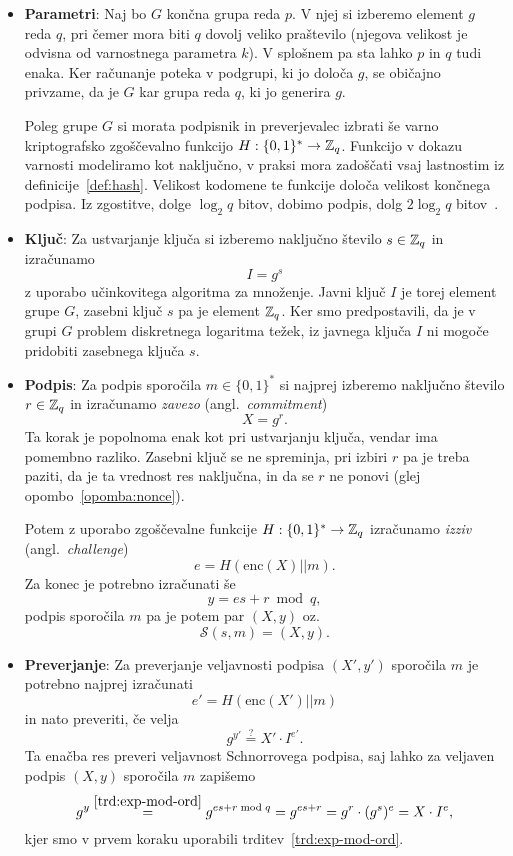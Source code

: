 \begin{itemize}
    \item \textbf{Parametri}:
    Naj bo $G$ končna grupa reda $p$. V njej si izberemo element $g$ reda $q$, pri čemer mora
    biti $q$ dovolj veliko praštevilo (njegova velikost je odvisna od varnostnega parametra $k$).
    V splošnem pa sta lahko $p$ in $q$ tudi enaka. Ker računanje poteka v podgrupi, ki jo določa $g$,
    se običajno privzame, da je $G$ kar grupa reda $q$, ki jo generira $g$.

    Poleg grupe $G$ si morata podpisnik in preverjevalec izbrati še varno kriptografsko zgoščevalno
    funkcijo $H : \{0, 1\}^* \rightarrow \mathbb Z_q$. Funkcijo v dokazu varnosti modeliramo kot naključno,
    v praksi mora zadoščati vsaj lastnostim iz definicije~\ref{def:hash}. Velikost kodomene te funkcije
    določa velikost končnega podpisa. Iz zgostitve, dolge $\log_2 q$ bitov, dobimo podpis, dolg
    $2 \log_2 q$ bitov~\cite{stinson2023crypto}.
    \item \textbf{Ključ}:
    Za ustvarjanje ključa si izberemo naključno število $s \in \mathbb Z_q$ in izračunamo
    $$
    I = g^s
    $$
    z uporabo učinkovitega algoritma za množenje. Javni ključ $I$ je torej element grupe $G$, zasebni ključ
    $s$ pa je element $\mathbb Z_q$. Ker smo predpostavili, da je v grupi $G$ problem diskretnega logaritma
    težek, iz javnega ključa $I$ ni mogoče pridobiti zasebnega ključa $s$.

    \item \textbf{Podpis}:
    Za podpis sporočila $m \in \{0, 1\}^*$ si najprej izberemo naključno število $r \in \mathbb Z_q$ in izračunamo
    \textit{zavezo} (angl.\ \textit{commitment})
    $$
    X = g^r.
    $$
    Ta korak je popolnoma enak kot pri ustvarjanju ključa, vendar ima pomembno razliko. Zasebni
    ključ se ne spreminja, pri izbiri $r$ pa je treba paziti, da je ta vrednost res naključna, in da se
    $r$ ne ponovi (glej opombo~\ref{opomba:nonce}).

    Potem z uporabo zgoščevalne funkcije $H : \{0, 1\}^* \rightarrow \mathbb Z_q$ izračunamo \textit{izziv}
    (angl.\ \textit{challenge})
    $$
    e = H(\text{enc}(X) || m).
    $$
    Za konec je potrebno izračunati še
    $$ 
    y = es + r \bmod q,
    $$
    podpis sporočila $m$ pa je potem par $(X, y)$ oz.\
    $$ 
    \mathcal{S}(s, m) = (X, y).
    $$

    \item \textbf{Preverjanje}:
    Za preverjanje veljavnosti podpisa $(X', y')$ sporočila $m$ je potrebno najprej izračunati
    $$
    e' = H(\text{enc}(X') || m)
    $$
    in nato preveriti, če velja
    \begin{equation}
        g^{y'} \stackrel{?}{=} X' \cdot I^{e'}. \label{eq:gen-schnorr-ver}
    \end{equation}
    Ta enačba res preveri veljavnost Schnorrovega podpisa, saj lahko za veljaven podpis $(X, y)$
    sporočila $m$ zapišemo
    $$
    g^y \stackrel{\ref{trd:exp-mod-ord}}{=} g^{es + r \bmod q} = g^{es + r} = g^r \cdot (g^s)^e = X \cdot I^e,
    $$
    kjer smo v prvem koraku uporabili trditev~\ref{trd:exp-mod-ord}.
\end{itemize}

